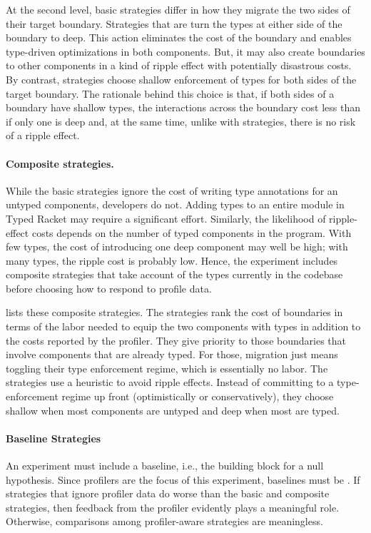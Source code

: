 

At the second level, basic strategies differ in how they migrate the two sides
 of their target boundary. Strategies that are \optkw{} turn the types at either
 side of the boundary to deep.
 This action eliminates the cost of the boundary and enables type-driven
 optimizations in both components.
 But, it may also create boundaries to other components in a kind of ripple
 effect with potentially disastrous costs.
 By contrast, \conkw{} strategies choose shallow enforcement of types for both
 sides of the target boundary.
 The rationale behind this choice is that, if both sides of a
 boundary have shallow types, the interactions across the boundary cost less
 than if only one is deep and, at the same time, unlike with \optkw{}
 strategies, there is no risk of a ripple effect.



\paragraph{Composite strategies.} While the basic strategies ignore the cost of
 writing type annotations for an untyped components, developers do not.
 Adding types to an entire module in Typed Racket may require a significant
 effort.
 Similarly, the likelihood of ripple-effect costs depends on the number
 of typed components in the program.
 With few types, the cost of introducing one deep component may well be high;
 with many types, the ripple cost is probably low.
 Hence, the experiment includes composite strategies that take account of the
 types currently in the codebase before choosing how to respond to profile data.

 lists these composite strategies.
 The \costkw{} strategies rank the cost of boundaries in terms of the labor needed to equip the two components
 with types in addition to the costs reported by the profiler.
 They give priority to those boundaries that involve components
 that are already typed.  For those, migration just means toggling their type
 enforcement regime, which is essentially no labor.
 The \confkw{} strategies use a heuristic to avoid ripple effects.
 Instead of committing to a type-enforcement regime up front
 (optimistically or conservatively), they choose shallow when most components
 are untyped and deep when most are typed.

\paragraph{Baseline Strategies} An experiment must include a baseline, i.e., the
 building block for a null hypothesis.
 Since profilers are the focus of this experiment, baselines must be
 \agnostickw{}.
 If strategies that ignore profiler data do worse than the basic and composite
 strategies, then feedback from the profiler evidently plays a meaningful role.
 Otherwise, comparisons among profiler-aware strategies are meaningless.

